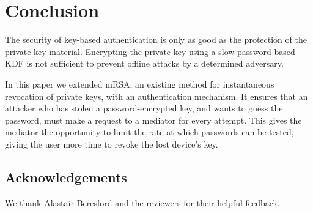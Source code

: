 \documentclass{llncs}
\begin{document}
\section{Conclusion}

The security of key-based authentication is only as good as the protection of the private key
material. Encrypting the private key using a slow password-based KDF is not sufficient to prevent
offline attacks by a determined adversary.

In this paper we extended mRSA, an existing method for instantaneous revocation of private keys,
with an authentication mechanism. It ensures that an attacker who has stolen a password-encrypted
key, and wants to guess the password, must make a request to a mediator for every attempt. This
gives the mediator the opportunity to limit the rate at which passwords can be tested, giving the
user more time to revoke the lost device's key.

\subsection*{Acknowledgements}

We thank Alastair Beresford and the reviewers for their helpful feedback.


{}
\end{document}
